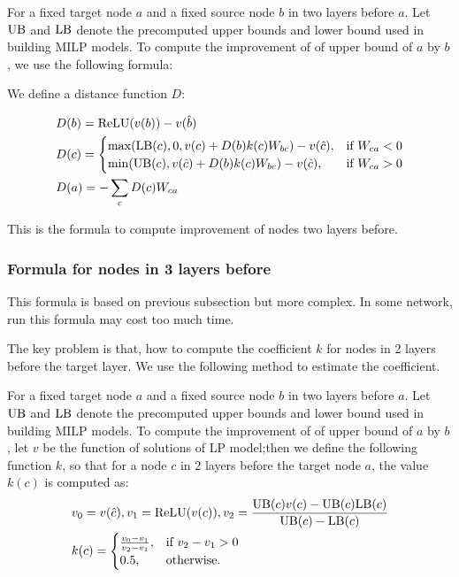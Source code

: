 \begin{definition}
	For a fixed target node $a$ and a fixed source node $b$ in two layers before $a$. Let $\mathrm{UB}$ and $\mathrm{LB}$ denote the precomputed upper bounds and lower bound used in building MILP models. To compute the improvement of of upper bound of $a$ by $b$, we use the following formula:
	
	We define a distance function $D$:
	
	\begin{align*}
		&D(b) = \mathrm{ReLU}(v(b))-v(\hat{b})\\
			&D(c) =
		\begin{cases}
			\max(\mathrm{LB}(c), 0, v(c)+D(b)k(c)W_{bc})-v(\hat{c}), & \text{if }W_{ca} < 0\\
			\min(\mathrm{UB}(c), v(\hat{c})+D(b)k(c)W_{bc})-v(\hat{c}), & \text{if }  W_{ca} > 0
		\end{cases}\\
		&D(a) = -\sum_c D(c)W_{ca}
	\end{align*}
\end{definition}

This is the formula to compute improvement of nodes two layers before.


\subsubsection*{Formula for nodes in 3 layers before} 

This formula is based on previous subsection but more complex. In some network, run this formula may cost too much time. 

The key problem is that, how to compute the coefficient $k$ for nodes in 2 layers before the target layer. We use the following method to estimate the coefficient.

\begin{definition}\label{3layer}
	For a fixed target node $a$ and a fixed source node $b$ in two layers before $a$. Let $\mathrm{UB}$ and $\mathrm{LB}$ denote the precomputed upper bounds and lower bound used in building MILP models. To compute the improvement of of upper bound of $a$ by $b$, let $v$ be the function of solutions of LP model;then we define the following function $k$, so that for a node $c$ in 2 layers before the target node $a$, the value $k(c)$ is computed as:
	\begin{align*}
		&v_0 = v(\hat{c}), v_1 = \mathrm{ReLU}(v(c)), v_2 = \frac{\mathrm{UB}(c)v(c)-\mathrm{UB}(c)\mathrm{LB}(c)}{\mathrm{UB}(c)-\mathrm{LB}(c)}\\
		&k(c) =
		\begin{cases}
			\frac{v_0-v_1}{v_2-v_1}, & \text{if } v_2-v_1 > 0\\
			0.5, & \text{otherwise.}
		\end{cases}
	\end{align*} 
\end{definition} 


